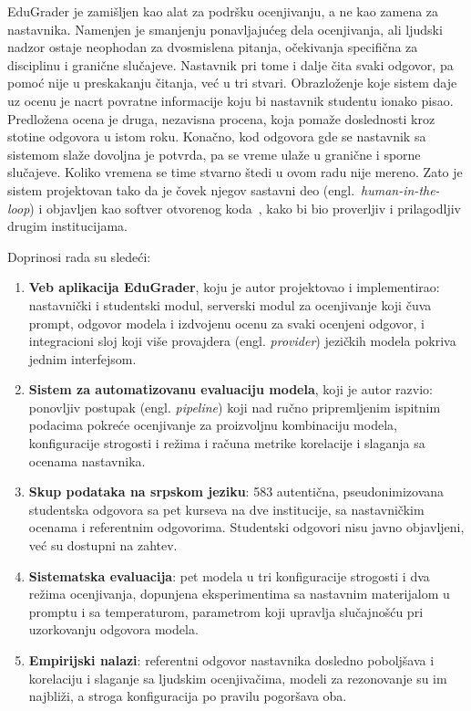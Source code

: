 EduGrader je zamišljen kao alat za podršku ocenjivanju, a ne kao zamena za nastavnika.
Namenjen je smanjenju ponavljajućeg dela ocenjivanja,
ali ljudski nadzor ostaje neophodan za dvosmislena pitanja, očekivanja specifična za disciplinu i granične slučajeve.
Nastavnik pri tome i dalje čita svaki odgovor, pa pomoć nije u preskakanju čitanja, već u tri stvari.
Obrazloženje koje sistem daje uz ocenu je nacrt povratne informacije koju bi nastavnik studentu ionako pisao.
Predložena ocena je druga, nezavisna procena, koja pomaže doslednosti kroz stotine odgovora u istom roku.
Konačno, kod odgovora gde se nastavnik sa sistemom slaže dovoljna je potvrda,
pa se vreme ulaže u granične i sporne slučajeve.
Koliko vremena se time stvarno štedi u ovom radu nije mereno.
Zato je sistem projektovan tako da je čovek njegov sastavni deo (engl.~\emph{human-in-the-loop})
i objavljen kao softver otvorenog koda~\cite{ikovic2026edugraderrepo},
kako bi bio proverljiv i prilagodljiv drugim institucijama.

Doprinosi rada su sledeći:
\begin{enumerate}
    \item \textbf{Veb aplikacija EduGrader}, koju je autor projektovao i implementirao:
    nastavnički i studentski modul, serverski modul za ocenjivanje koji čuva prompt, odgovor modela i izdvojenu ocenu za svaki ocenjeni odgovor,
    i integracioni sloj koji više provajdera (engl. \emph{provider}) jezičkih modela pokriva jednim interfejsom.
    \item \textbf{Sistem za automatizovanu evaluaciju modela}, koji je autor razvio:
    ponovljiv postupak (engl. \emph{pipeline}) koji nad ručno pripremljenim ispitnim podacima pokreće ocenjivanje
    za proizvoljnu kombinaciju modela, konfiguracije strogosti i režima i računa metrike korelacije i slaganja sa ocenama nastavnika.
    \item \textbf{Skup podataka na srpskom jeziku}: 583 autentična, pseudonimizovana studentska odgovora sa pet kurseva na dve institucije,
    sa nastavničkim ocenama i referentnim odgovorima.
    Studentski odgovori nisu javno objavljeni, već su dostupni na zahtev.
    \item \textbf{Sistematska evaluacija}: pet modela u tri konfiguracije strogosti i dva režima ocenjivanja,
    dopunjena eksperimentima sa nastavnim materijalom u promptu i sa temperaturom,
    parametrom koji upravlja slučajnošću pri uzorkovanju odgovora modela.
    \item \textbf{Empirijski nalazi}: referentni odgovor nastavnika dosledno poboljšava i korelaciju i slaganje sa ljudskim ocenjivačima,
    modeli za rezonovanje su im najbliži, a stroga konfiguracija po pravilu pogoršava oba.
\end{enumerate}

